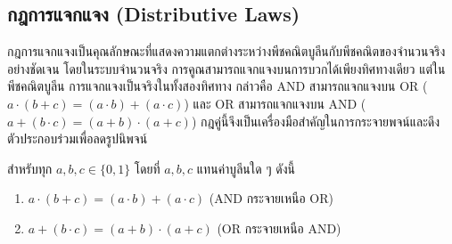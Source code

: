 \subsection{กฎการแจกแจง (Distributive Laws)}
กฎการแจกแจงเป็นคุณลักษณะที่แสดงความแตกต่างระหว่างพีชคณิตบูลีนกับพีชคณิตของจำนวนจริงอย่างชัดเจน โดยในระบบจำนวนจริง การคูณสามารถแจกแจงบนการบวกได้เพียงทิศทางเดียว แต่ในพีชคณิตบูลีน การแจกแจงเป็นจริงในทั้งสองทิศทาง กล่าวคือ AND สามารถแจกแจงบน OR ($a \cdot (b + c) = (a \cdot b) + (a \cdot c)$) และ OR สามารถแจกแจงบน AND ($a + (b \cdot c) = (a + b) \cdot (a + c)$) กฎคู่นี้จึงเป็นเครื่องมือสำคัญในการกระจายพจน์และดึงตัวประกอบร่วมเพื่อลดรูปนิพจน์~\parencite{gersting2014structures}

\begin{thrm}[กฎการแจกแจง]
สำหรับทุก $a, b, c \in \{0, 1\}$ โดยที่ $a, b, c$ แทนค่าบูลีนใด ๆ ดังนี้

\begin{enumerate}
    \item $a \cdot (b + c) = (a \cdot b) + (a \cdot c)$ \hfill (AND กระจายเหนือ OR)
    \item $a + (b \cdot c) = (a + b) \cdot (a + c)$ \hfill (OR กระจายเหนือ AND)
\end{enumerate}
\end{thrm}

